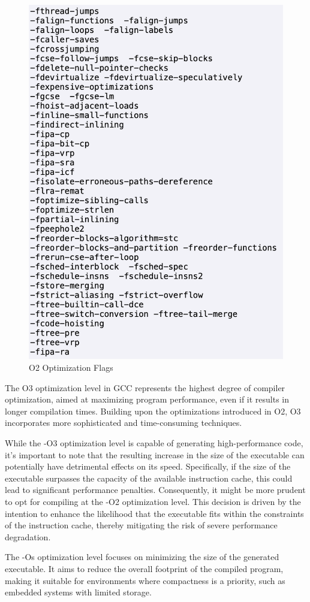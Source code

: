 \documentclass[conference]{IEEEtran}
\begin{document}
\begin{figure}[htbp]
\centering
\includegraphics [width=0.7\linewidth]{pictures/o2.png}
\caption{O2 Optimization Flags\cite{b2}}
\label{fig3}
\end{figure}

The O3 optimization level in GCC represents the highest degree of compiler optimization, aimed at maximizing program performance, even if it results in longer compilation times. Building upon the optimizations introduced in O2, O3 incorporates more sophisticated and time-consuming techniques.

While the -O3 optimization level is capable of generating high-performance code, it's important to note that the resulting increase in the size of the executable can potentially have detrimental effects on its speed. Specifically, if the size of the executable surpasses the capacity of the available instruction cache, this could lead to significant performance penalties. Consequently, it might be more prudent to opt for compiling at the -O2 optimization level. This decision is driven by the intention to enhance the likelihood that the executable fits within the constraints of the instruction cache, thereby mitigating the risk of severe performance degradation.

The -Os optimization level focuses on minimizing the size of the generated executable. It aims to reduce the overall footprint of the compiled program, making it suitable for environments where compactness is a priority, such as embedded systems with limited storage.
\end{document}
